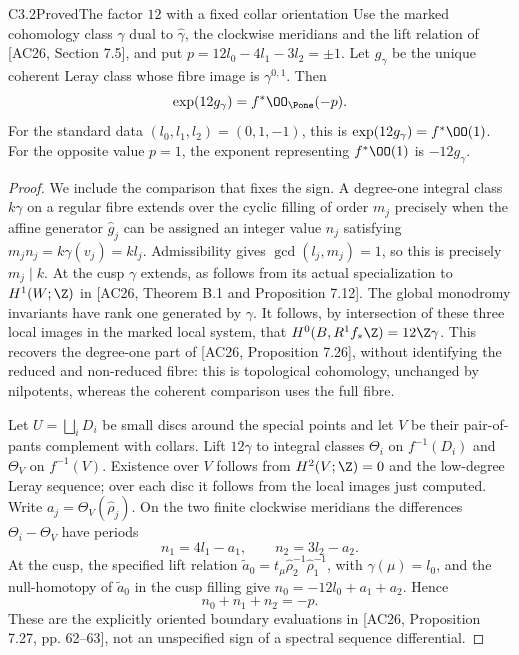 \begin{claim}{C3.2}{Proved}{The factor $12$ with a fixed collar orientation}
Use the marked cohomology class $\gamma$ dual to
$\hat\gamma$, the clockwise meridians and the lift relation of
[AC26, Section 7.5], and put
$p=12l_0-4l_1-3l_2=\pm1$.  Let $g_\gamma$ be the unique coherent
Leray class whose fibre image is $\gamma^{0,1}$.  Then
\begin{equation}\label{eq:C-factor12}
\exp(12g_\gamma)=f^*\OO_{\Pone}(-p).
\end{equation}
For the standard data $(l_0,l_1,l_2)=(0,1,-1)$, this is
$\exp(12g_\gamma)=f^*\OO(1)$.  For the opposite value $p=1$,
the exponent representing $f^*\OO(1)$ is $-12g_\gamma$.
\end{claim}
\begin{proof}
We include the comparison that fixes the sign.  A degree-one integral
class $k\gamma$ on a regular fibre extends over the cyclic filling of
order $m_j$ precisely when the affine generator $\hat g_j$ can be
assigned an integer value $n_j$ satisfying
$m_j n_j=k\gamma(v_j)=kl_j$.  Admissibility gives
$\gcd(l_j,m_j)=1$, so this is precisely $m_j\mid k$.
At the cusp $\gamma$ extends, as follows from its actual specialization
to $H^1(W;\Z)$ in [AC26, Theorem B.1 and Proposition 7.12].
The global monodromy invariants have rank one generated by $\gamma$.
It follows, by intersection of these three local images in the marked
local system, that
$H^0(B,R^1f_*\Z)=12\Z\gamma$.  This recovers the degree-one
part of [AC26, Proposition 7.26], without identifying the reduced and
non-reduced fibre: this is topological cohomology, unchanged by
nilpotents, whereas the coherent comparison uses the full fibre.

Let $U=\bigsqcup_iD_i$ be small discs around the special points and
let $V$ be their pair-of-pants complement with collars.  Lift
$12\gamma$ to integral classes $\Theta_i$ on $f^{-1}(D_i)$ and
$\Theta_V$ on $f^{-1}(V)$.  Existence over $V$ follows from
$H^2(V;\Z)=0$ and the low-degree Leray sequence; over each disc it
follows from the local images just computed.  Write
$a_j=\Theta_V(\hat\rho_j)$.  On the two finite clockwise meridians
the differences $\Theta_i-\Theta_V$ have periods
\[
n_1=4l_1-a_1,\qquad n_2=3l_2-a_2.
\]
At the cusp, the specified lift relation
$\widetilde a_0=t_\mu\hat\rho_2^{-1}\hat\rho_1^{-1}$,
with $\gamma(\mu)=l_0$, and the null-homotopy of
$\widetilde a_0$ in the cusp filling give
$n_0=-12l_0+a_1+a_2$.  Hence
\begin{equation}\label{eq:C-collar-sum}
n_0+n_1+n_2=-p.
\end{equation}
These are the explicitly oriented boundary evaluations in [AC26,
Proposition 7.27, pp. 62--63], not an unspecified sign of a spectral
sequence differential.


\end{proof}
